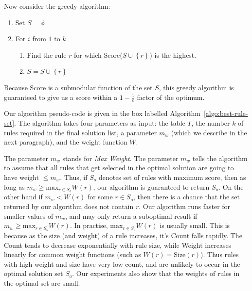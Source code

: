 \documentclass{sig-alternate}
\begin{document}
Now consider the greedy algorithm:

\begin{framed}
\begin{enumerate}
\item Set $S = \phi$
\item For $i$ from $1$ to $k$
\begin{enumerate}
\item Find the rule $r$ for which Score($S \cup \left\lbrace r \right\rbrace$) is the highest.
\item $S = S \cup \left\lbrace r \right\rbrace$
\end{enumerate}
\end{enumerate}
\end{framed}

Because Score is a submodular function of the set $S$, this greedy algorithm is guaranteed to give us a score within a $1 - \frac{1}{e}$ factor of the optimum. 

Our algorithm pseudo-code is given in the box labelled Algorithm~\ref{algo:best-rule-set}. The algorithm takes four parameters as input: the table $T$, the number $k$ of rules required in the final solution list, a parameter $m_w$ (which we describe in the next paragraph), and the weight function $W$. 

The parameter $m_w$ stands for \textit{Max Weight}. The parameter $m_w$ tells the algorithm to assume that all rules that get selected in the optimal solution are going to have weight $\leq m_w$. Thus, if $S_o$ denotes set of rules with maximum score, then as long as $m_w \geq \textrm{max}_{r \in S_o}W(r)$, our algorithm is guaranteed to return $S_o$. On the other hand if $m_w < W(r)$ for some $r \in S_o$, then there is a chance that the set returned by our algorithm does not contain $r$. Our algorithm runs faster for smaller values of $m_w$, and may only return a suboptimal result if $m_w \geq \textrm{max}_{r \in S_o}W(r)$. In practise, $\textrm{max}_{r \in S_o}W(r)$ is usually small. This is because as the size (and weight) of a rule increases, it's Count falls rapidly. The Count tends to decrease exponentially with rule size, while Weight increases linearly for common weight functions (such as $W(r) = \text{Size}(r)$). Thus rules with high weight and size have very low count, and are unlikely to occur in the optimal solution set $S_o$. Our experiments also show that the weights of rules in the optimal set are small.

\end{document}
